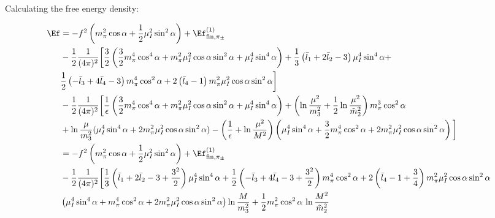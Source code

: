 \documentclass{article}
\begin{document}
Calculating the free energy density:

\begin{align}
    \Ef &=
    - f^2 \left(m_\pi^2 \cos \alpha + \frac{1}{2}\mu_I^2 \sin^2 \alpha\right)
    + \Ef^{(1)}_{\mathrm{fin}, \pi_\pm}
    \\ 
    &
    - \frac{1}{2}\frac{1}{(4 \pi)^2}
    \bigg[
        \frac{3}{2}
        \left(
            \frac{3}{2}m_\pi^4 \cos^4 \alpha + m_\pi^2 \mu_I^2 \cos \alpha \sin^2\alpha + \mu_I^4 \sin^4 \alpha
        \right)
        + 
        \frac{1}{3}
        \left( 
            \bar l_1 + 2 \bar l_2 - 3
        \right) \mu_I^4 \sin^4 \alpha
        +
        \\ 
        &
        \frac{1}{2}
        \left(
            - \bar l_3 + 4 \bar l_4 - 3
        \right) m_\pi^4 \cos^2\alpha 
        + 2 \left(\bar l_4 - 1\right)
        m_\pi^2 \mu_I^2 \cos\alpha \sin^2 \alpha
    \bigg]
    \\
    &
    - \frac{1}{2} \frac{1}{(4 \pi)^2}
    \bigg[
        \frac{1}{\epsilon}
        \left(
            \frac{3}{2}m_\pi^4 \cos^4 \alpha + m_\pi^2 \mu_I^2 \cos \alpha \sin^2\alpha + \mu_I^4 \sin^4 \alpha
        \right)
        + 
        \left(\ln\frac{\mu^2}{m_3^2} + \frac{1}{2} \ln \frac{\mu^2}{\tilde m^2_2}\right)
        m_\pi^3 \cos^2 \alpha
        \\
        &
        + \ln \frac{\mu}{m_3^2}(\mu_I^4 \sin^4 \alpha + 2m_\pi^2 \mu_I^2 \cos \alpha \sin^2 \alpha)
        - 
        \left(\frac{1}{\epsilon} + \ln \frac{\mu^2}{M^2}\right) 
        \left(
            \mu_I^4\sin^4\alpha + \frac{3}{2} m_\pi^4 \cos^2 \alpha
            + 2 m_\pi^2 \mu_I^2 \cos\alpha \sin^2 \alpha
        \right)
    \bigg]
    \\
    &
    =
    - f^2 \left(m_\pi^2 \cos \alpha + \frac{1}{2}\mu_I^2 \sin^2 \alpha\right)
    + \Ef^{(1)}_{\mathrm{fin}, \pi_\pm}
    \\ 
    &
    - \frac{1}{2}\frac{1}{(4 \pi)^2}
    \bigg[
        \frac{1}{3}
        \left( 
            \bar l_1 + 2 \bar l_2 - 3 + \frac{3^2}{2}
        \right) \mu_I^4 \sin^4 \alpha
        +
        \frac{1}{2}
        \left(
            - \bar l_3 + 4 \bar l_4 - 3 + \frac{3^2}{2}
        \right) m_\pi^4 \cos^2\alpha 
        + 2 \left(\bar l_4 - 1 + \frac{3}{4}\right)
        m_\pi^2 \mu_I^2 \cos\alpha \sin^2 \alpha
    \\
    &
    \left(
        \mu_I^4\sin^4\alpha + m_\pi^4 \cos^2 \alpha
        + 2 m_\pi^2 \mu_I^2 \cos\alpha \sin^2 \alpha
    \right)
    \ln \frac{M}{m_3^2}
    + \frac{1}{2} m_\pi^2 \cos^2 \alpha \, \ln \frac{M^2}{\tilde m^2_2}

\end{align}
\end{document}
